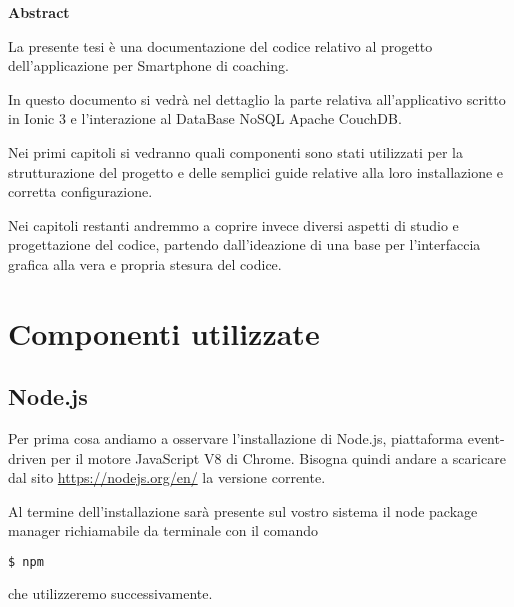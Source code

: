 \documentclass[a4paper,titlepage]{book}
\makeatletter
\newcommand\abstractname{Abstract}  %
\newenvironment{abstract}{%
      \titlepage
      \null\vfil
      \@beginparpenalty\@lowpenalty
      \begin{center}%
        \bfseries \abstractname
        \@endparpenalty\@M
      \end{center}}%
     {\par\vfil\null\endtitlepage}
\newenvironment{abstract}{%
      \if@twocolumn
        \section*{\abstractname}%
      \else
        \small
        \begin{center}%
          {\bfseries \abstractname\vspace{-.5em}\vspace{\z@}}%
        \end{center}%
        \quotation
      \fi}
      {\if@twocolumn\else\endquotation\fi}
\makeatother
\begin{document}
\pagestyle{plain}

\begin{frontespizio}
\end{frontespizio}

\frontmatter

\begin{abstract}
La presente tesi \`{e} una documentazione del codice relativo al progetto dell'applicazione per {\foreignlanguage{english} Smartphone} di {\foreignlanguage{english} coaching}. 

In questo documento si vedr\`{a} nel dettaglio la parte relativa all'applicativo scritto in Ionic 3 e l'interazione al {\foreignlanguage{english} DataBase NoSQL} Apache CouchDB.

Nei primi capitoli si vedranno quali componenti sono stati utilizzati per la strutturazione del progetto e delle semplici guide relative alla loro installazione e corretta configurazione.

Nei capitoli restanti andremmo a coprire invece diversi aspetti di studio e progettazione del codice, partendo dall'ideazione di una base per l'interfaccia grafica alla vera e propria stesura del codice.
\end{abstract}

\tableofcontents

\mainmatter
\chapter{Componenti utilizzate}


\section{Node.js}
Per prima cosa andiamo a osservare l'installazione di Node.js, piattaforma {\foreignlanguage{english} event-driven} per il motore JavaScript V8 di Chrome. Bisogna quindi andare a scaricare dal sito \url{https://nodejs.org/en/} la versione corrente.

Al termine dell'installazione sar\`{a} presente sul vostro sistema il {\foreignlanguage{english} node package manager} richiamabile da terminale con il comando
\begin{lstlisting}[language=bash]
  $ npm
\end{lstlisting}
che utilizzeremo successivamente.
\end{document}
